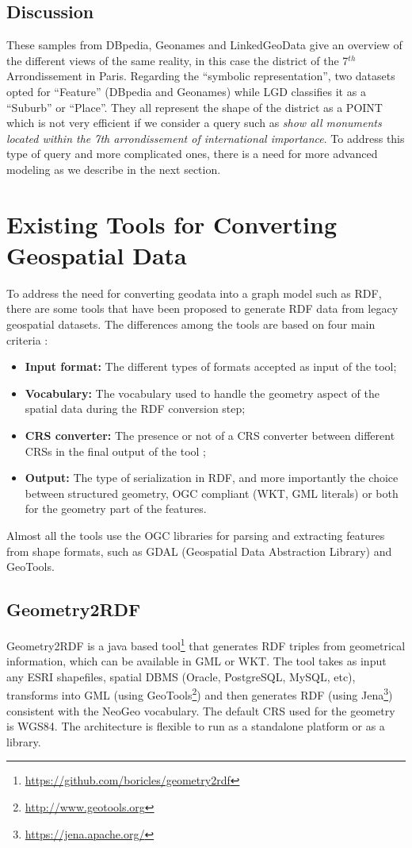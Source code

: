 \subsection{Discussion}
These samples from DBpedia, Geonames and LinkedGeoData give an overview of the different views of the same reality, in this case the district of the 7$^{th}$ Arrondissement in Paris. Regarding the ``symbolic representation'', two datasets opted for ``Feature'' (DBpedia and Geonames) while LGD classifies it as a ``Suburb'' or ``Place''. They all represent the shape of the district as a POINT which is not very efficient if we consider a query such as \emph{show all monuments located within the 7th arrondissement of international importance}. To address this type of query and more complicated ones, there is a need for more advanced modeling as we describe in the next section.

\section{Existing Tools for Converting Geospatial Data}
\label{sec:toolgeo}
To address the need for converting geodata into a graph model such as RDF, there are some tools that have been proposed to generate RDF data from legacy geospatial datasets. The differences among the tools are based on four main criteria :
\begin{itemize}
\item \textbf{Input format:} The different types of formats accepted as input of the tool;
\item \textbf{Vocabulary:} The vocabulary used to handle the geometry aspect of the spatial data during the RDF conversion step;
\item \textbf{CRS converter:} The presence or not of a CRS converter between different CRSs in the final output of the tool ;
\item \textbf{Output:} The type of serialization in RDF, and more importantly the choice between structured geometry, OGC compliant (WKT, GML literals) or both for the geometry part of the features.
\end{itemize}

Almost all the tools use the OGC libraries for parsing and extracting features from shape formats, such as GDAL (Geospatial Data Abstraction Library) and GeoTools.

\subsection{Geometry2RDF} \label{sec:geo2rdf}
Geometry2RDF \cite{deLeon2010} is a java based tool\footnote{\url{https://github.com/boricles/geometry2rdf}} that generates RDF triples from geometrical information, which can be available in GML or WKT. The tool takes as input any ESRI shapefiles, spatial DBMS (Oracle,  PostgreSQL, MySQL, etc), transforms into GML (using GeoTools\footnote{\url{http://www.geotools.org}}) and then generates RDF (using Jena\footnote{\url{https://jena.apache.org/}}) consistent with the NeoGeo vocabulary. The default CRS used for the geometry is WGS84. The architecture is flexible to run as a standalone platform or as a library.


